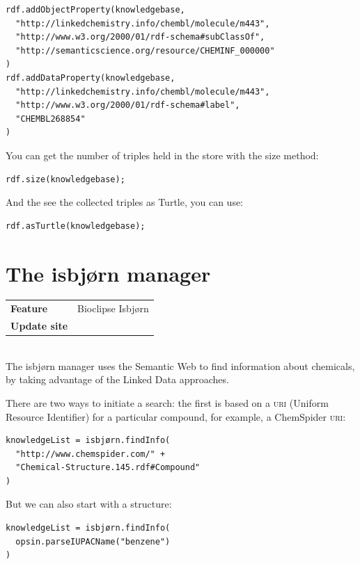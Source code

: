 \documentclass{book}
\renewcommand{\todo}[1]{{\color{white}\oldtodo{\textsf{#1}}}}
\begin{document}
\begin{refsection}
\begin{Verbatim}
rdf.addObjectProperty(knowledgebase,
  "http://linkedchemistry.info/chembl/molecule/m443",
  "http://www.w3.org/2000/01/rdf-schema#subClassOf",
  "http://semanticscience.org/resource/CHEMINF_000000"
)
rdf.addDataProperty(knowledgebase,
  "http://linkedchemistry.info/chembl/molecule/m443",
  "http://www.w3.org/2000/01/rdf-schema#label",
  "CHEMBL268854"
)
\end{Verbatim}


You can get the number of triples held in the store with the
size method:

\begin{Verbatim}
rdf.size(knowledgebase);
\end{Verbatim}

And the see the collected triples as Turtle\todo{unclear, explain this a bit more}, you can use:

\begin{Verbatim}
rdf.asTurtle(knowledgebase);
\end{Verbatim}


\section{The isbjørn manager}

\begin{tabular}{ll}
\textbf{Feature} & Bioclipse Isbjørn \\
\textbf{Update site} & \url{} \\
\end{tabular} \\

The isbjørn manager uses the Semantic Web to find information about
chemicals, by taking advantage of the Linked Data approaches.

There are two ways to initiate a search: the first is based on a
\textsc{uri} (Uniform Resource Identifier)
for a particular compound, for example, a ChemSpider
\textsc{uri}:

\begin{Verbatim}
knowledgeList = isbjørn.findInfo(
  "http://www.chemspider.com/" +
  "Chemical-Structure.145.rdf#Compound"
)
\end{Verbatim}

But we can also start with a structure:

\begin{Verbatim}
knowledgeList = isbjørn.findInfo(
  opsin.parseIUPACName("benzene")
)
\end{Verbatim}


\end{refsection}
\end{document}
